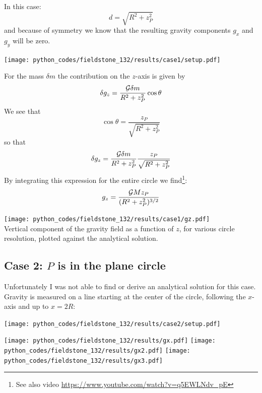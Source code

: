 In this case:
\[
d=\sqrt{R^2 + z_P^2}
\]
and because of symmetry we know that the resulting 
gravity components $g_x$ and $g_y$ will be zero.

\begin{center}
\texttt{[image: python\_codes/fieldstone\_132/results/case1/setup.pdf]}
\end{center}

For the mass $\delta m$ the contribution on the $z$-axis is given by 
\[
\delta g_z = \frac{{\cal G} \delta m}{R^2+z_P^2} \cos\theta 
\] 
We see that 
\[
\cos\theta = \frac{z_P}{\sqrt{R^2+z_P^2}}
\]
so that
\[
\delta g_z = \frac{{\cal G} \delta m}{R^2+z_P^2}\frac{z_P}{\sqrt{R^2+z_P^2}}
\] 
By integrating this expression for the entire circle we 
find\footnote{See also video \url{https://www.youtube.com/watch?v=q5EWLNdv_pE}}:
\[
g_z=\frac{{\cal G} M z_P}{(R^2+z_P^2)^{3/2}}
\]

\begin{center}
\texttt{[image: python\_codes/fieldstone\_132/results/case1/gz.pdf]}\\
{\captionfont Vertical component of the gravity field as a function of $z$, 
for various circle resolution, plotted against the analytical solution.}
\end{center}



\subsection*{Case 2: $P$ is in the plane circle}

Unfortunately I was not able to find or derive an analytical solution for this case.
Gravity is measured on a line starting at the center of the circle, following the 
$x$-axis and up to $x=2R$:

\begin{center}
\texttt{[image: python\_codes/fieldstone\_132/results/case2/setup.pdf]}
\end{center}

\begin{center}
\texttt{[image: python\_codes/fieldstone\_132/results/gx.pdf]}
\texttt{[image: python\_codes/fieldstone\_132/results/gx2.pdf]}
\texttt{[image: python\_codes/fieldstone\_132/results/gx3.pdf]}
\end{center}
